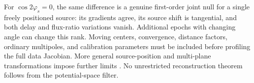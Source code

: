 For $\cos2\varphi_s=0$, the same difference is a genuine first-order joint null for a single freely positioned source: its gradients agree, its source shift is tangential, and both delay and flux-ratio variations vanish. Additional epochs with changing angle can change this rank. Moving centers, convergence, distance factors, ordinary multipoles, and calibration parameters must be included before profiling the full data Jacobian. More general source-position and multi-plane transformations impose further limits \cite{SchneiderSluse2014,Schneider1997,Schneider2019,Fleury2021}. No unrestricted reconstruction theorem follows from the potential-space filter.

